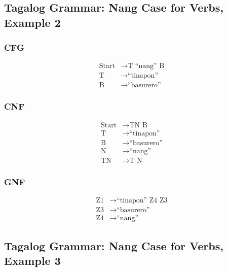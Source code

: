 \newpage
\subsection{Tagalog Grammar: Nang Case for Verbs, Example 2}
\subsubsection{CFG}
\begin{equation*}
    \begin{aligned}
        \text{Start}   & \rightarrow \text{T “nang” B}   \\
        \text{T} & \rightarrow \text{“tinapon”} \\
        \text{B} & \rightarrow \text{“basurero”}
    \end{aligned}
\end{equation*}

\subsubsection{CNF}
\begin{equation*}
    \begin{aligned}
        \text{Start}   & \rightarrow \text{TN B}   \\
        \text{T} & \rightarrow \text{“tinapon”} \\
        \text{B} & \rightarrow \text{“basurero”} \\
        \text{N} & \rightarrow \text{“nang”} \\
        \text{TN} & \rightarrow \text{T N}
    \end{aligned}
\end{equation*}

\subsubsection{GNF}
\begin{equation*}
    \begin{aligned}
        \text{Z1}   & \rightarrow \text{“tinapon” Z4 Z3}   \\
        \text{Z3} & \rightarrow \text{“basurero”} \\
        \text{Z4} & \rightarrow \text{“nang”}
    \end{aligned}
\end{equation*}

\newpage
\subsection{Tagalog Grammar: Nang Case for Verbs, Example 3}

